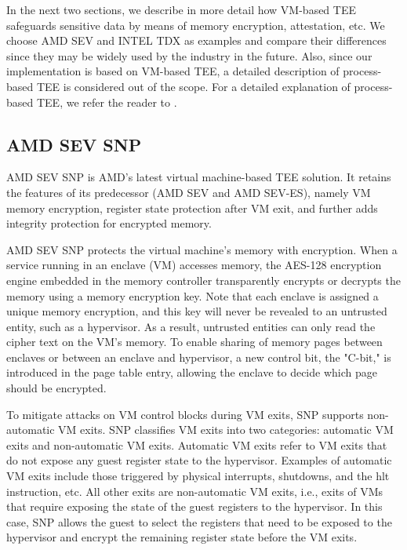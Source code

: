 In the next two sections, we describe in more detail how VM-based TEE safeguards sensitive data by means of memory encryption, attestation, etc. We choose AMD SEV and INTEL TDX as examples and compare their differences since they may be widely used by the industry in the future.
Also, since our implementation is based on VM-based TEE, 
a detailed description of process-based TEE is considered out of the scope. For a detailed explanation of process-based TEE, we refer the reader to \cite*{cryptoeprint:2016/086} \cite*{10.1145/2487726.2488370} \cite*{SGX_PAPER_LIST}.


\subsection{AMD SEV SNP}
AMD SEV SNP\cite*{sev_smp} is AMD's latest virtual machine-based TEE solution. It retains the features of its predecessor (AMD SEV\cite*{sev} and AMD SEV-ES\cite*{sev_es}), namely VM memory 
encryption, register state protection after VM exit, and further adds integrity protection for encrypted memory.

AMD SEV SNP protects the virtual machine's memory with encryption. When a service running in an enclave (VM) accesses memory, the AES-128 encryption engine embedded in the memory controller 
transparently encrypts or decrypts the memory using a memory encryption key. Note that each enclave is assigned a unique memory encryption, and this key will never be revealed to an untrusted 
entity, such as a hypervisor. As a result, untrusted entities can only read the cipher text on the VM's memory. To enable sharing of memory pages between enclaves or between an enclave and 
hypervisor, a new control bit, the "C-bit," is introduced in the page table entry, allowing the enclave to decide which page should be encrypted.

To mitigate attacks on VM control blocks during VM exits, SNP supports non-automatic VM exits. SNP classifies VM exits into two categories: automatic VM exits and non-automatic VM exits. 
Automatic VM exits refer to VM exits that do not expose any guest register state to the hypervisor. Examples of automatic VM exits include those triggered by physical interrupts, shutdowns, 
and the hlt instruction, etc. All other exits are non-automatic VM exits, i.e., exits of VMs that require exposing the state of the guest registers to the hypervisor. In this case, 
SNP allows the guest to select the registers that need to be exposed to the hypervisor and encrypt the remaining register state before the VM exits.

